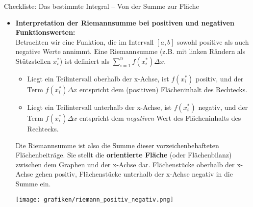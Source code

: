 \begin{loesungsumgebung}{Checkliste: Das bestimmte Integral – Von der Summe zur Fläche}
\begin{enumerate}[label=(\alph*)]
\begin{itemize}
        \item \textbf{Interpretation der Riemannsumme bei positiven und negativen Funktionswerten:} \\
        Betrachten wir eine Funktion, die im Intervall $[a,b]$ sowohl positive als auch negative Werte annimmt. Eine Riemannsumme (z.B. mit linken Rändern als Stützstellen $x_i^*$) ist definiert als $\sum_{i=1}^n f(x_i^*) \Delta x$.
        \begin{itemize}
            \item Liegt ein Teilintervall oberhalb der x-Achse, ist $f(x_i^*)$ positiv, und der Term $f(x_i^*) \Delta x$ entspricht dem (positiven) Flächeninhalt des Rechtecks.
            \item Liegt ein Teilintervall unterhalb der x-Achse, ist $f(x_i^*)$ negativ, und der Term $f(x_i^*) \Delta x$ entspricht dem \textit{negativen} Wert des Flächeninhalts des Rechtecks.
        \end{itemize}
        Die Riemannsumme ist also die Summe dieser vorzeichenbehafteten Flächenbeiträge. Sie stellt die \textbf{orientierte Fläche} (oder Flächenbilanz) zwischen dem Graphen und der x-Achse dar. Flächenstücke oberhalb der x-Achse gehen positiv, Flächenstücke unterhalb der x-Achse negativ in die Summe ein.
        \begin{center}
        \texttt{[image: grafiken/riemann\_positiv\_negativ.png]}
        \label{fig:riemann_positiv_negativ}
        \end{center}
    \end{itemize}


\end{enumerate}
\end{loesungsumgebung}
